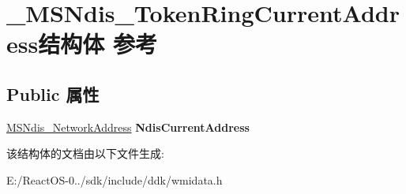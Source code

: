 \hypertarget{struct___m_s_ndis___token_ring_current_address}{}\section{\+\_\+\+M\+S\+Ndis\+\_\+\+Token\+Ring\+Current\+Address结构体 参考}
\label{struct___m_s_ndis___token_ring_current_address}
\subsection*{Public 属性}
\begin{DoxyCompactItemize}
\item 
\mbox{\label{struct___m_s_ndis___token_ring_current_address_a7be7d47e0d56d8ee3eb854046f094b5e}} 
\hyperlink{struct___m_s_ndis___network_address}{M\+S\+Ndis\+\_\+\+Network\+Address} {\bfseries Ndis\+Current\+Address}
\end{DoxyCompactItemize}


该结构体的文档由以下文件生成\+:\begin{DoxyCompactItemize}
\item 
E\+:/\+React\+O\+S-\/0../sdk/include/ddk/wmidata.\+h\end{DoxyCompactItemize}

